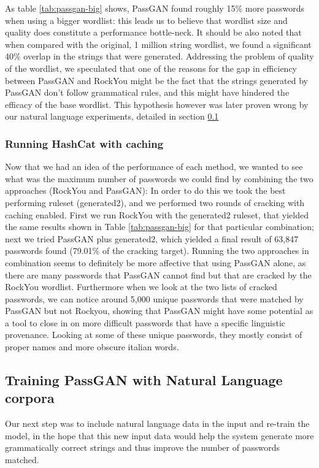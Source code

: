 As table \ref{tab:passgan-big} shows, PassGAN found roughly 15\% more passwords when using a bigger wordlist: this leads us to believe that wordlist size and quality does constitute a performance bottle-neck. It should be also noted that when compared with the original, 1 million string wordlist, we found a significant 40\% overlap in the strings that were generated. Addressing the problem of quality of the wordlist, we speculated that one of the reasons for the gap in efficiency between PassGAN and RockYou might be the fact that the strings generated by PassGAN don't follow grammatical rules, and this might have hindered the efficacy of the base wordlist. This hypothesis however was later proven wrong by our natural language experiments, detailed in section \ref{subsec:nl-testing}

\subsubsection{Running HashCat with caching}\label{subsubsec:potfile-enable}
Now that we had an idea of the performance of each method, we wanted to see what was the maximum number of passwords we could find by combining the two approaches (RockYou and PassGAN):
In order to do this we took the best performing ruleset (generated2), and we performed two rounds of cracking with caching enabled. First we run RockYou with the generated2 ruleset, that yielded the same results shown in Table \ref{tab:passgan-big} for that particular combination; next we tried PassGAN plus generated2, which yielded a final result of 63,847 passwords found (79.01\% of the cracking target). Running the two approaches in combination seems to definitely be more affective that using PassGAN alone, as there are many passwords that PassGAN cannot find but that are cracked by the RockYou wordlist.
Furthermore when we look at the two lists of cracked passwords, we can notice around 5,000 unique passwords that were matched by PassGAN but not Rockyou, showing that PassGAN might have some potential as a tool to close in on more difficult passwords that have a specific linguistic provenance. Looking at some of these unique passwords, they mostly consist of proper names and more obscure italian words.

\subsection{Training PassGAN with Natural Language corpora} \label{subsec:nl-testing}
Our next step was to include natural language data in the input and re-train the model, in the hope that this new input data would help the system generate more grammatically correct strings and thus improve the number of passwords matched.


